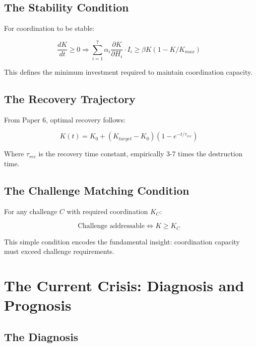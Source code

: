 \documentclass[12pt,letterpaper]{article}
\begin{document}
\subsection{The Stability Condition}

For coordination to be stable:

\begin{equation}
\frac{dK}{dt} \geq 0 \Rightarrow \sum_{i=1}^{7} \alpha_i \frac{\partial K}{\partial H_i} \cdot I_i \geq \beta K (1 - K/K_{max})
\end{equation}

This defines the minimum investment required to maintain coordination capacity.

\subsection{The Recovery Trajectory}

From Paper 6, optimal recovery follows:

\begin{equation}
K(t) = K_0 + (K_{target} - K_0)(1 - e^{-t/\tau_{rec}})
\end{equation}

Where $\tau_{rec}$ is the recovery time constant, empirically 3-7 times the destruction time.

\subsection{The Challenge Matching Condition}

For any challenge $C$ with required coordination $K_C$:

\begin{equation}
\text{Challenge addressable} \Leftrightarrow K \geq K_C
\end{equation}

This simple condition encodes the fundamental insight: coordination capacity must exceed challenge requirements.

\section{The Current Crisis: Diagnosis and Prognosis}

\subsection{The Diagnosis}
\end{document}
